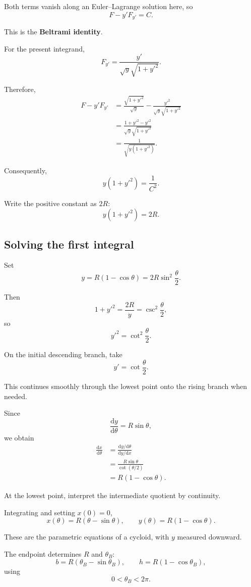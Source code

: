 \documentclass[11pt,a4paper]{article}
\newcommand{\dd}{\mathrm{d}}
\begin{document}
Both terms vanish along an Euler--Lagrange solution here, so
\[
\boxed{F-y'F_{y'}=C.}
\]

This is the \textbf{Beltrami identity}.

For the present integrand,
\[
F_{y'}
=
\frac{y'}{\sqrt y\sqrt{1+y'^2}}.
\]

Therefore,
\begin{align*}
F-y'F_{y'}
&=
\frac{\sqrt{1+y'^2}}{\sqrt y}
-
\frac{y'^2}{\sqrt y\sqrt{1+y'^2}}\\
&=
\frac{1+y'^2-y'^2}
{\sqrt y\sqrt{1+y'^2}}\\
&=
\frac1{\sqrt{y(1+y'^2)}}.
\end{align*}

Consequently,
\[
y(1+y'^2)=\frac1{C^2}.
\]

Write the positive constant as \(2R\):
\[
\boxed{y(1+y'^2)=2R.}
\]

\subsection*{Solving the first integral}

Set
\[
y=R(1-\cos\theta)
=
2R\sin^2\frac\theta2.
\]

Then
\[
1+y'^2
=
\frac{2R}{y}
=
\csc^2\frac\theta2,
\]
so
\[
y'^2=\cot^2\frac\theta2.
\]

On the initial descending branch, take
\[
y'=\cot\frac\theta2.
\]

This continues smoothly through the lowest point onto the
rising branch when needed.

Since
\[
\frac{\dd y}{\dd\theta}=R\sin\theta,
\]
we obtain
\begin{align*}
\frac{\dd x}{\dd\theta}
&=
\frac{\dd y/\dd\theta}{\dd y/\dd x}\\
&=
\frac{R\sin\theta}{\cot(\theta/2)}\\
&=
R(1-\cos\theta).
\end{align*}

At the lowest point, interpret the intermediate quotient by
continuity.

Integrating and setting \(x(0)=0\),
\[
\boxed{
x(\theta)=R(\theta-\sin\theta),
\qquad
y(\theta)=R(1-\cos\theta).
}
\]

These are the parametric equations of a cycloid, with \(y\)
measured downward.

The endpoint determines \(R\) and \(\theta_B\):
\[
b=R(\theta_B-\sin\theta_B),
\qquad
h=R(1-\cos\theta_B),
\]
using
\[
0<\theta_B<2\pi.
\]
\end{document}
